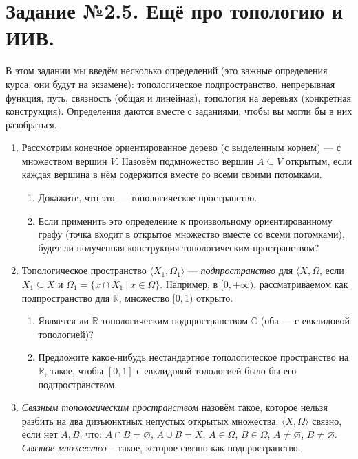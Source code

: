 \documentclass[10pt,a4paper,oneside]{article}
\begin{document}
\section*{Задание №2.5. Ещё про топологию и ИИВ.}

В этом задании мы введём несколько определений (это важные определения курса, они будут на экзамене):
топологическое подпространство, непрерывная функция, путь, связность (общая и линейная), 
топология на деревьях (конкретная конструкция).
Определения даются вместе с заданиями, чтобы вы могли бы в них разобраться.

\begin{enumerate}
\item Рассмотрим конечное ориентированное дерево (с выделенным корнем) --- с множеством вершин $V$. 
Назовём подмножество вершин $A \subseteq V$ открытым, если каждая вершина в нём содержится вместе
со всеми своими потомками. \begin{enumerate}
\item Докажите, что это --- топологическое пространство.
\item Если применить это определение к произвольному ориентированному графу (точка входит в открытое
множество вместе со всеми потомками), будет ли полученная конструкция топологическим пространством?
\end{enumerate}

\item Топологическое пространство $\langle X_1, \Omega_1\rangle$ --- \emph{подпространство} для $\langle X, \Omega$,
если $X_1 \subseteq X$ и $\Omega_1 = \{ x \cap X_1\ |\ x \in \Omega  \}$. Например, в $[0, +\infty)$, рассматриваемом
как подпространство для $\mathbb{R}$, множество $[0,1)$ открыто.

\begin{enumerate}
\item Является ли $\mathbb{R}$ топологическим подпространством $\mathbb{C}$ (оба --- с евклидовой топологией)?

\item Предложите какое-нибудь нестандартное топологическое пространство на $\mathbb{R}$, 
такое, чтобы $[0,1]$ с евклидовой толологией было бы его подпространством.
\end{enumerate}

\item \emph{Связным топологическим пространством} назовём такое, которое нельзя разбить
на два дизъюнктных непустых открытых множества:
$\langle X,\Omega \rangle$ связно, если нет $A,B$, что:
$A \cap B = \varnothing$, $A \cup B = X$, $A \in \Omega$, $B \in \Omega$, $A \ne \varnothing$, $B \ne \varnothing$.
\emph{Связное множество} -- такое, которое связно как подпространство.


\end{enumerate}
\end{document}

